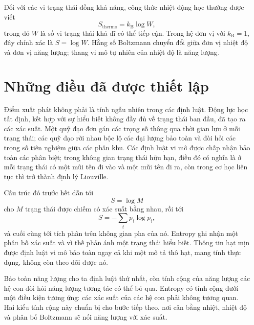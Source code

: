 Đối với các vi trạng thái đồng khả năng, công thức nhiệt động học thường được viết
\begin{equation}
 S_{\mathrm{thermo}}=k_{\mathrm B}\log W,
 \label{eq:sm1-boltzmann-formula}
\end{equation}
trong đó \(W\) là số vi trạng thái khả dĩ có thể tiếp cận. Trong hệ đơn vị với \(k_{\mathrm B}=1\), đây chính xác là \(S=\log W\). Hằng số Boltzmann chuyển đổi giữa đơn vị nhiệt độ và đơn vị năng lượng; thang vi mô tự nhiên của nhiệt độ là năng lượng.

\begin{classroomqa}
\end{classroomqa}

\section{Những điều đã được thiết lập}

Điểm xuất phát không phải là tính ngẫu nhiên trong các định luật. Động lực học tất định, kết hợp với sự hiểu biết không đầy đủ về trạng thái ban đầu, đã tạo ra các xác suất. Một quỹ đạo đơn gán các trọng số thông qua thời gian lưu ở mỗi trạng thái; các quỹ đạo rời nhau bộc lộ các đại lượng bảo toàn và đòi hỏi các trọng số tiên nghiệm giữa các phân khu. Các định luật vi mô được chấp nhận bảo toàn các phân biệt; trong không gian trạng thái hữu hạn, điều đó có nghĩa là ở mỗi trạng thái có một mũi tên đi vào và một mũi tên đi ra, còn trong cơ học liên tục thì trở thành định lý Liouville.

Cấu trúc đó trước hết dẫn tới
\begin{equation}
 S=\log M
\end{equation}
cho \(M\) trạng thái được chiếm có xác suất bằng nhau, rồi tới
\begin{equation}
 S=-\sum_i p_i\log p_i,
\end{equation}
và cuối cùng tới tích phân trên không gian pha của nó. Entropy ghi nhận một phân bố xác suất và vì thế phản ánh một trạng thái hiểu biết. Thông tin hạt mịn được định luật vi mô bảo toàn ngay cả khi một mô tả thô hạt, mang tính thực dụng, không còn theo dõi được nó.

Bảo toàn năng lượng cho ta định luật thứ nhất, còn tính cộng của năng lượng các hệ con đòi hỏi năng lượng tương tác có thể bỏ qua. Entropy có tính cộng dưới một điều kiện tương ứng: các xác suất của các hệ con phải không tương quan. Hai kiểu tính cộng này chuẩn bị cho bước tiếp theo, nơi cân bằng nhiệt, nhiệt độ và phân bố Boltzmann sẽ nối năng lượng với xác suất.
